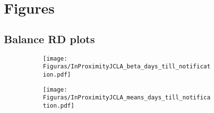 \documentclass[oneside,11pt]{article}
\begin{document}
\clearpage

\section{Figures}

\subsection{Balance RD plots}
\begin{figure}[H]

    \caption{RD plots for balance variables across those assigned to either UNAM or IPN high-school, and those who are not\label{fig:Balance_rd_plot}}
    \begin{center}
    
    \begin{subfigure}{0.475\textwidth}
        \centering
        \texttt{[image: Figuras/InProximityJCLA\_beta\_days\_till\_notification.pdf]}
    \end{subfigure}
    \begin{subfigure}{0.475\textwidth}
        \centering
        \texttt{[image: Figuras/InProximityJCLA\_means\_days\_till\_notification.pdf]}
    \end{subfigure}
    
    \end{center}
\end{figure}



\clearpage

\end{document}

